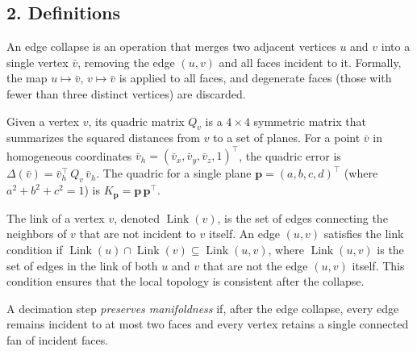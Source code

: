 \subsection{2. Definitions}

\begin{definition}\label{def:edge_collapse}
An edge collapse is an operation that merges two adjacent vertices $u$ and $v$ into a single vertex $\bar{v}$, removing the edge $(u, v)$ and all faces incident to it. Formally, the map $u \mapsto \bar{v}$, $v \mapsto \bar{v}$ is applied to all faces, and degenerate faces (those with fewer than three distinct vertices) are discarded.
\end{definition}

\begin{definition}\label{def:quadric_error_metric}
Given a vertex $v$, its quadric matrix $Q_v$ is a $4 \times 4$ symmetric matrix that summarizes the squared distances from $v$ to a set of planes. For a point $\bar{v}$ in homogeneous coordinates $\bar{v}_h = (\bar{v}_x, \bar{v}_y, \bar{v}_z, 1)^\top$, the quadric error is $\Delta(\bar{v}) = \bar{v}_h^\top \, Q_v \, \bar{v}_h$. The quadric for a single plane $\mathbf{p} = (a, b, c, d)^\top$ (where $a^2 + b^2 + c^2 = 1$) is $K_\mathbf{p} = \mathbf{p} \, \mathbf{p}^\top$.
\end{definition}

\begin{definition}\label{def:link_condition}
The link of a vertex $v$, denoted $\operatorname{Link}(v)$, is the set of edges connecting the neighbors of $v$ that are not incident to $v$ itself. An edge $(u, v)$ satisfies the link condition if $\operatorname{Link}(u) \cap \operatorname{Link}(v) \subseteq \operatorname{Link}(u, v)$, where $\operatorname{Link}(u, v)$ is the set of edges in the link of both $u$ and $v$ that are not the edge $(u, v)$ itself. This condition ensures that the local topology is consistent after the collapse.
\end{definition}

\begin{definition}\label{def:manifold_preservation}
A decimation step \emph{preserves manifoldness} if, after the edge collapse, every edge remains incident to at most two faces and every vertex retains a single connected fan of incident faces.
\end{definition}

